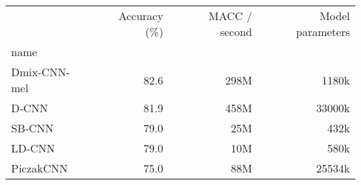 \begin{tabular}{lrrr}
\toprule
{} &  Accuracy (\%) & MACC / second & Model parameters \\
name         &               &               &                  \\
\midrule
Dmix-CNN-mel &          82.6 &          298M &            1180k \\
D-CNN        &          81.9 &          458M &           33000k \\
SB-CNN       &          79.0 &           25M &             432k \\
LD-CNN       &          79.0 &           10M &             580k \\
PiczakCNN    &          75.0 &           88M &           25534k \\
\bottomrule
\end{tabular}
